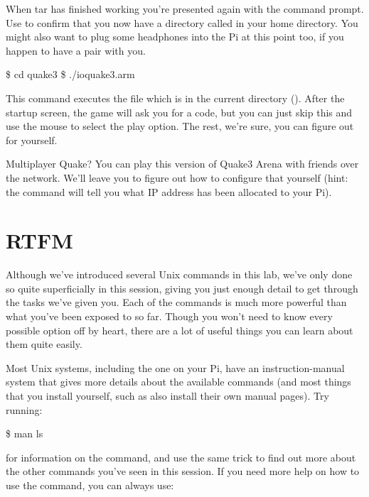 \noindent When tar has finished working you're presented again with the command prompt. Use  to confirm that you now have a directory called  in your home directory.  You might also want to plug some headphones into the Pi at this point too, if you happen to have a pair with you.

\begin{ttoutenv}
\$ cd quake3
\$ ./ioquake3.arm
\end{ttoutenv}

This command executes the file  which is in the current directory (). After the startup screen, the game will ask you for a code, but you can just skip this and use the mouse to select the play option. The rest, we're sure, you can figure out for yourself.

\begin{diversion}{Multiplayer Quake?}
You can play this version of Quake3 Arena with friends over the network. We'll leave you to figure out how to configure that yourself (hint: the  command will tell you what IP address has been allocated to your Pi).
\end{diversion}

\FloatBarrier
\section{RTFM}

Although we've introduced several Unix commands in this lab, we've only done so quite superficially in this session, giving you just enough detail to get through the tasks we've given you. Each of the commands is much more powerful than what you've been exposed to so far. Though you won't need to know every possible option off by heart, there are a lot of useful things you can learn about them quite easily.

Most Unix systems, including the one on your Pi, have an instruction-manual system that gives more details about the available commands (and most things that you install yourself, such as  also install their own manual pages).  Try running:

\begin{ttoutenv}
\$ man ls
\end{ttoutenv}

\noindent for information on the  command, and use the same trick to find out more about the other commands you've seen in this session. If you need more help on how to use the  command, you can always use:

